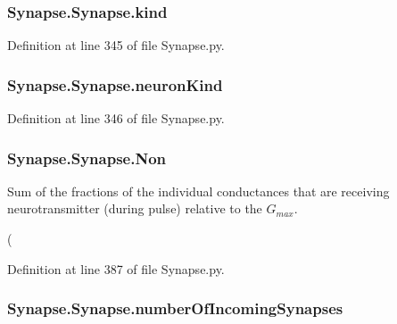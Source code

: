 \subsubsection[{\texorpdfstring{kind}{kind}}]{\setlength{\rightskip}{0pt plus 5cm}Synapse.\+Synapse.\+kind}\hypertarget{class_synapse_1_1_synapse_aa2ea45450a3ad13cfefcae9fabe6ce15}{}\label{class_synapse_1_1_synapse_aa2ea45450a3ad13cfefcae9fabe6ce15}


Definition at line 345 of file Synapse.\+py.

\subsubsection[{\texorpdfstring{neuron\+Kind}{neuronKind}}]{\setlength{\rightskip}{0pt plus 5cm}Synapse.\+Synapse.\+neuron\+Kind}\hypertarget{class_synapse_1_1_synapse_a031af2fe7be76f9b5f69c087228a1b9a}{}\label{class_synapse_1_1_synapse_a031af2fe7be76f9b5f69c087228a1b9a}


Definition at line 346 of file Synapse.\+py.

\subsubsection[{\texorpdfstring{Non}{Non}}]{\setlength{\rightskip}{0pt plus 5cm}Synapse.\+Synapse.\+Non}\hypertarget{class_synapse_1_1_synapse_af8779bbc2ee2c5ae7747ee5cfbcf112e}{}\label{class_synapse_1_1_synapse_af8779bbc2ee2c5ae7747ee5cfbcf112e}


Sum of the fractions of the individual conductances that are receiving neurotransmitter (during pulse) relative to the $G_{max}$. 

( 

Definition at line 387 of file Synapse.\+py.

\subsubsection[{\texorpdfstring{number\+Of\+Incoming\+Synapses}{numberOfIncomingSynapses}}]{\setlength{\rightskip}{0pt plus 5cm}Synapse.\+Synapse.\+number\+Of\+Incoming\+Synapses}\hypertarget{class_synapse_1_1_synapse_a6e55e008336cc47551669f3d77248d57}{}\label{class_synapse_1_1_synapse_a6e55e008336cc47551669f3d77248d57}



